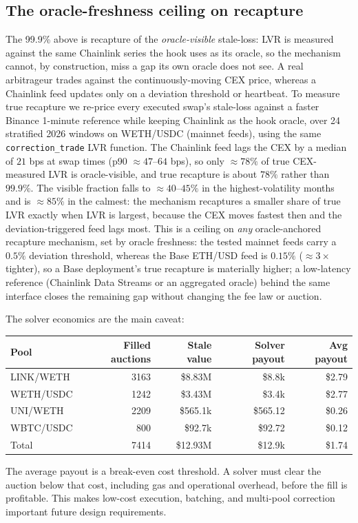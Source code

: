 \documentclass[11pt]{article}
\begin{document}
\subsection{The oracle-freshness ceiling on recapture}
The 99.9\% above is recapture of the \emph{oracle-visible} stale-loss: LVR is measured against the same Chainlink series the hook uses as its oracle, so the mechanism cannot, by construction, miss a gap its own oracle does not see. A real arbitrageur trades against the continuously-moving CEX price, whereas a Chainlink feed updates only on a deviation threshold or heartbeat. To measure true recapture we re-price every executed swap's stale-loss against a faster Binance 1-minute reference while keeping Chainlink as the hook oracle, over 24 stratified 2026 windows on WETH/USDC (mainnet feeds), using the same \texttt{correction\_trade} LVR function. The Chainlink feed lags the CEX by a median of $21$ bps at swap times (p90 $\approx 47$--$64$ bps), so only $\approx 78\%$ of true CEX-measured LVR is oracle-visible, and true recapture is about $78\%$ rather than $99.9\%$. The visible fraction falls to $\approx 40$--$45\%$ in the highest-volatility months and is $\approx 85\%$ in the calmest: the mechanism recaptures a smaller share of true LVR exactly when LVR is largest, because the CEX moves fastest then and the deviation-triggered feed lags most. This is a ceiling on \emph{any} oracle-anchored recapture mechanism, set by oracle freshness: the tested mainnet feeds carry a $0.5\%$ deviation threshold, whereas the Base ETH/USD feed is $0.15\%$ ($\approx 3\times$ tighter), so a Base deployment's true recapture is materially higher; a low-latency reference (Chainlink Data Streams or an aggregated oracle) behind the same interface closes the remaining gap without changing the fee law or auction.

The solver economics are the main caveat:
\begin{center}
\begin{tabular}{lrrrr}
\toprule
Pool & Filled auctions & Stale value & Solver payout & Avg payout \\
\midrule
LINK/WETH & 3163 & \$8.83M & \$8.8k & \$2.79 \\
WETH/USDC & 1242 & \$3.43M & \$3.4k & \$2.77 \\
UNI/WETH & 2209 & \$565.1k & \$565.12 & \$0.26 \\
WBTC/USDC & 800 & \$92.7k & \$92.72 & \$0.12 \\
\midrule
Total & 7414 & \$12.93M & \$12.9k & \$1.74 \\
\bottomrule
\end{tabular}
\end{center}
The average payout is a break-even cost threshold. A solver must clear the auction below that cost, including gas and operational overhead, before the fill is profitable. This makes low-cost execution, batching, and multi-pool correction important future design requirements.
\end{document}
